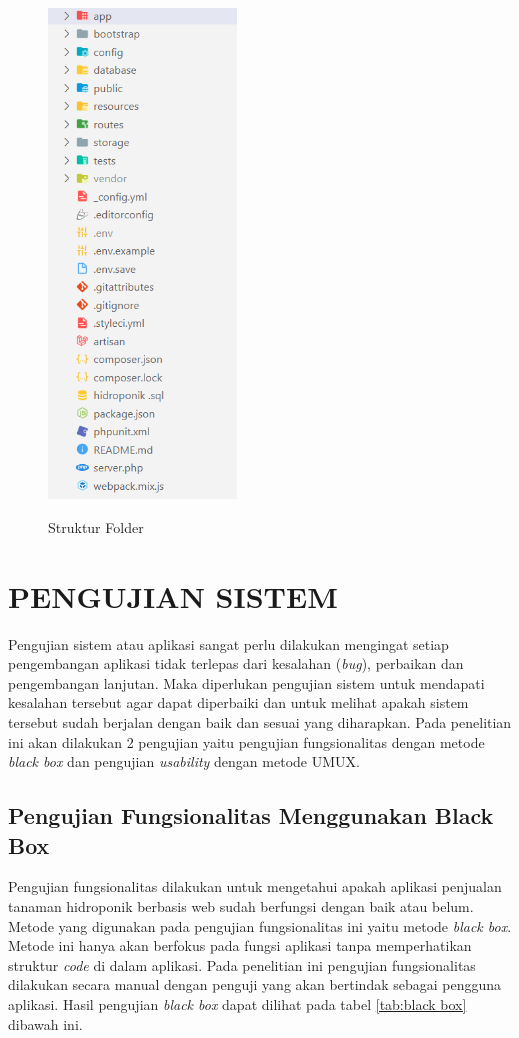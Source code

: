 \begin{enumerate}
	\begin{figure}[H]
		\centering
		{\includegraphics [width = 5cm, height= 13cm]{gambar/struktur folder}}
		\caption{Struktur Folder}
		\label{struktur folder}
	\end{figure}
\end{enumerate}

\section{\uppercase{Pengujian Sistem}}
Pengujian sistem atau aplikasi sangat perlu dilakukan mengingat setiap pengembangan aplikasi tidak terlepas dari kesalahan (\textit{bug}), perbaikan dan pengembangan lanjutan. Maka diperlukan pengujian sistem untuk mendapati kesalahan tersebut agar dapat diperbaiki dan untuk melihat apakah sistem tersebut sudah berjalan dengan baik dan sesuai yang diharapkan. Pada penelitian ini akan dilakukan 2 pengujian yaitu pengujian fungsionalitas dengan metode \textit{black box} dan pengujian \textit{usability} dengan metode UMUX.

\subsection{Pengujian Fungsionalitas Menggunakan Black Box}
Pengujian fungsionalitas dilakukan untuk mengetahui apakah aplikasi penjualan tanaman hidroponik berbasis web sudah berfungsi dengan baik atau belum. Metode yang digunakan pada pengujian fungsionalitas ini yaitu metode \textit{black box}. Metode ini hanya akan berfokus pada fungsi aplikasi tanpa memperhatikan struktur \textit{code} di dalam aplikasi. Pada penelitian ini pengujian fungsionalitas dilakukan secara manual dengan penguji yang akan bertindak sebagai pengguna aplikasi. Hasil pengujian \textit{black box} dapat dilihat pada tabel \ref*{tab:black box} dibawah ini.

